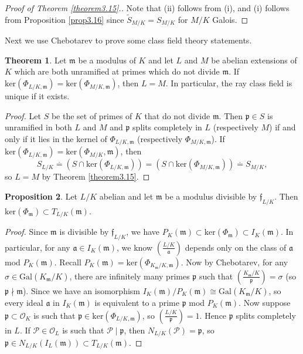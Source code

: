 \documentclass{article}
\theoremstyle{definition}
\newtheorem{theorem}{Theorem}[section]
\newtheorem{prop}[theorem]{Proposition}
\begin{document}
\begin{proof}[Proof of Theorem \ref{theorem3.15}.]
    Note that (ii) follows from (i), and (i) follows from Proposition \ref{prop3.16} since $\widetilde{S}_{M/K} = S_{M/K}$ for $M/K$ Galois.
\end{proof}
Next we use Chebotarev to prove some class field theory statements.
\begin{theorem}\label{theorem3.18}
    Let $\mathfrak{m}$ be a modulus of $K$ and let $L$ and $M$ be abelian extensions of $K$ which are both unramified at primes which do not divide $\mathfrak{m}$. If $\text{ker}(\Phi_{L/K,\mathfrak{m}})=\text{ker}(\Phi_{M/K,\mathfrak{m}})$, then $L=M$. In particular, the ray class field is unique if it exists.
\end{theorem}
\begin{proof}
    Let $S$ be the set of primes of $K$ that do not divide $\mathfrak{m}$. Then $\mathfrak{p} \in S$ is unramified in both $L$ and $M$ and $\mathfrak{p}$ splits completely in $L$ (respectively $M$) if and only if it lies in the kernel of $\Phi_{L/K,\mathfrak{m}}$ (respectively $\Phi_{M/K,\mathfrak{m}}$). If $\text{ker}(\Phi_{L/K,\mathfrak{m}}) = \text{ker}(\Phi_{M/K},\mathfrak{m})$, then $$S_{L/K} \stackrel{\cdot }{=} (S \cap \text{ker}(\Phi_{L/K,\mathfrak{m}})) = (S \cap \text{ker}(\Phi_{M/K,\mathfrak{m}})) \stackrel{\cdot }{=} S_{M/K},$$
    so $L = M$ by Theorem \ref{theorem3.15}.
\end{proof}
\begin{prop}\label{prop3.19}
    Let $L/K$ abelian and let $\mathfrak{m}$ be a modulus divisible by $\mathfrak{f}_{L/K}$. Then $\text{ker}(\Phi_{\mathfrak{m}}) \subset T_{L/K}(\mathfrak{m})$.
\end{prop}
\begin{proof}
    Since $\mathfrak{m}$ is divisible by $\mathfrak{f}_{L/K}$, we have $P_K(\mathfrak{m})\subset \text{ker}(\Phi_{\mathfrak{m}})\subset I_{K}(\mathfrak{m})$. In particular, for any $\mathfrak{a} \in I_K(\mathfrak{m})$, we know $\left(\frac{L/K}{\mathfrak{a}}\right)$ depends only on the class of $\mathfrak{a}$ mod $P_K(\mathfrak{m})$. Recall $P_K(\mathfrak{m}) = \text{ker}(\Phi_{K_{\mathfrak{m}}/K,\mathfrak{m}})$. Now by Chebotarev, for any $\sigma \in \text{Gal}(K_{\mathfrak{m}}/K)$, there are infinitely many primes $\mathfrak{p}$ such that $\left(\frac{K_\mathfrak{m}/K}{\mathfrak{p}}\right)=\sigma$ (so $\mathfrak{p} \nmid \mathfrak{m}$). Since we have an isomorphism $I_K(\mathfrak{m})/P_{K}(\mathfrak{m}) \cong \text{Gal}(K_{\mathfrak{m}}/K)$, so every ideal $\mathfrak{a}$ in $I_K(\mathfrak{m})$ is equivalent to a prime $\mathfrak{p}$ mod $P_K(\mathfrak{m})$. Now suppose $\mathfrak{p} \subset \mathcal{O}_K$ is such that $\mathfrak{p} \in \text{ker}(\Phi_{L/K,\mathfrak{m}})$, so $\left(\frac{L/K}{\mathfrak{p}}\right) = 1$. Hence $\mathfrak{p}$ splits completely in $L$. If $\mathcal{P} \in \mathcal{O}_L$ is such that $\mathcal{P} \mid \mathfrak{p}$, then $N_{L/K}(\mathcal{P})=\mathfrak{p}$, so $\mathfrak{p} \in N_{L/K}(I_L(\mathfrak{m})) \subset T_{L/K}(\mathfrak{m})$.
\end{proof}
\end{document}
